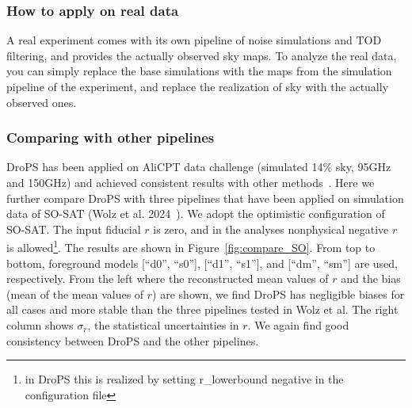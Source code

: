 \documentclass[12pt, a4paper]{ctexart} %
\begin{document}
\subsubsection{How to apply on real data}

A real experiment comes with its own pipeline of noise simulations and TOD filtering, and provides the actually observed sky maps. To analyze the real data, you can simply replace the base simulations with the maps from the simulation pipeline of the experiment, and replace the realization of sky with the actually observed ones.


\subsubsection{Comparing with other pipelines}

DroPS has been applied on AliCPT data challenge (simulated 14\% sky, 95GHz and 150GHz) and achieved consistent results with other methods~\cite{Zhang24}. Here we further compare DroPS with three pipelines that have been applied on simulation data of SO-SAT (Wolz et al. 2024~\cite{SO-SAT}). We adopt the optimistic configuration of SO-SAT. The input fiducial $r$ is zero, and in the analyses nonphysical negative $r$ is allowed\footnote{in DroPS this is realized by setting r\_lowerbound negative in the configuration file}.  The results are shown in Figure~\ref{fig:compare_SO}.  From top to bottom, foreground models [``d0'', ``s0''], [``d1'', ``s1''], and [``dm'', ``sm''] are used, respectively. From the left where the reconstructed mean values of $r$ and the bias (mean of the mean values of $r$) are shown, we find DroPS has negligible biases for all cases and more stable than the three pipelines tested in Wolz et al. The right column shows $\sigma_r$, the statistical uncertainties in $r$. We again find good consistency between DroPS and the other pipelines.
\end{document}

